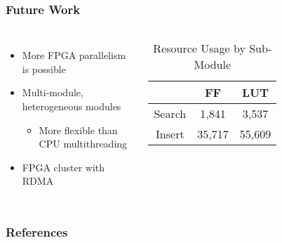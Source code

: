 \documentclass{beamer}
\begin{document}
\begin{frame}
	\frametitle{Future Work}
	\begin{columns}
		\begin{itemize}
			\item More FPGA parallelism is possible
			\item Multi-module, heterogeneous modules
			\begin{itemize}
				\item More flexible than CPU multithreading
			\end{itemize}
			\item FPGA cluster with RDMA
		\end{itemize}

		\begin{table}
			\begin{tabular}{c|cc}
				& FF & LUT \\
				\hline
				Search & 1,841 & 3,537 \\
				Insert & 35,717 & 55,609 \\
			\end{tabular}
			\caption{Resource Usage by Sub-Module}
		\end{table}
	\end{columns}
\end{frame}


\begin{frame}
	\frametitle{References}
	\printbibliography
\end{frame}
\end{document}
